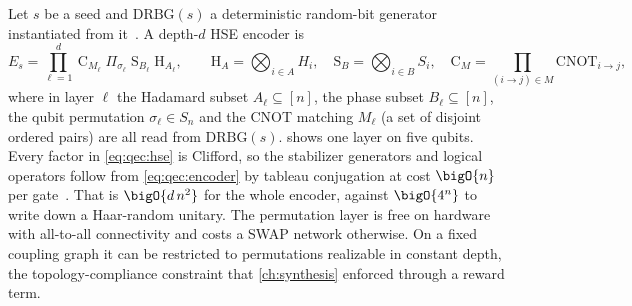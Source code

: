 Let $s$ be a seed and $\mathrm{DRBG}(s)$ a deterministic random-bit generator instantiated from it~\cite{nist2015sp80090a}. A depth-$d$ HSE encoder is
\begin{equation}\label{eq:qec:hse}
  E_s=\prod_{\ell=1}^{d}\ \mathrm{C}_{M_\ell}\;\Pi_{\sigma_\ell}\;\mathrm{S}_{B_\ell}\;\mathrm{H}_{A_\ell},
  \qquad
  \mathrm{H}_{A}=\bigotimes_{i\in A}H_i,\quad
  \mathrm{S}_{B}=\bigotimes_{i\in B}S_i,\quad
  \mathrm{C}_{M}=\prod_{(i\to j)\in M}\mathrm{CNOT}_{i\to j},
\end{equation}
where in layer $\ell$ the Hadamard subset $A_\ell\subseteq[n]$, the phase subset $B_\ell\subseteq[n]$, the qubit permutation $\sigma_\ell\in S_n$ and the CNOT matching $M_\ell$ (a set of disjoint ordered pairs) are all read from $\mathrm{DRBG}(s)$.  shows one layer on five qubits. Every factor in \cref{eq:qec:hse} is Clifford, so the stabilizer generators and logical operators follow from \cref{eq:qec:encoder} by tableau conjugation at cost $\bigO{n}$ per gate~\cite{aaronson2004stabilizer}. That is $\bigO{d\,n^{2}}$ for the whole encoder, against $\bigO{4^{n}}$ to write down a Haar-random unitary. The permutation layer is free on hardware with all-to-all connectivity and costs a SWAP network otherwise. On a fixed coupling graph it can be restricted to permutations realizable in constant depth, the topology-compliance constraint that \cref{ch:synthesis} enforced through a reward term.

